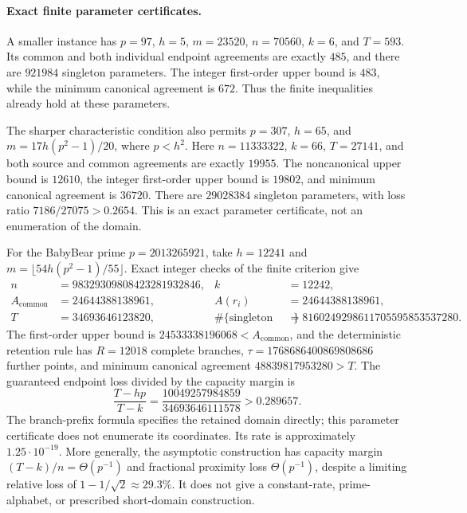 \paragraph{Exact finite parameter certificates.}
A smaller instance has $p=97$, $h=5$, $m=23520$, $n=70560$,
$k=6$, and $T=593$. Its common and both individual endpoint agreements are exactly $485$,
and there are $921984$ singleton
parameters. The integer first-order upper bound is $483$, while the
minimum canonical agreement is $672$. Thus the finite inequalities
already hold at these parameters.


The sharper characteristic condition also permits $p=307$, $h=65$,
and $m=17h(p^2-1)/20$, where $p<h^2$. Here
$n=11333322$, $k=66$, $T=27141$, and both source and common
agreements are exactly $19955$. The noncanonical upper bound is
$12610$, the integer first-order upper bound is $19802$, and minimum
canonical agreement is $36720$. There are $29028384$ singleton
parameters, with loss ratio $7186/27075>0.2654$. This is an exact
parameter certificate, not an enumeration of the domain.

For the BabyBear prime $p=2013265921$, take $h=12241$ and
$m=\lfloor54h(p^2-1)/55\rfloor$. Exact integer checks of the finite
criterion give
\[
 \begin{aligned}
 n&=98329309808423281932846,& k&=12242,\\
 A_{\mathrm{common}}&=24644388138961,&
 A(r_i)&=24644388138961,\\
 T&=34693646123820,&
 \#\{\text{singleton labels}\}&=8160249298611705595853537280.
 \end{aligned}
\]
The first-order upper bound is $24533338196068<A_{\mathrm{common}}$,
and the deterministic retention rule has $R=12018$ complete branches,
$\tau=1768686400869808686$ further points, and minimum canonical
agreement $48839817953280>T$. The guaranteed endpoint loss divided
by the capacity margin is
\[
 \frac{T-hp}{T-k}
 =\frac{10049257984859}{34693646111578}>0.289657.
\]
The branch-prefix formula specifies the retained domain directly; this
parameter certificate does not enumerate its coordinates. Its rate is
approximately $1.25\cdot10^{-19}$. More generally, the asymptotic
construction has capacity margin $(T-k)/n=\Theta(p^{-1})$ and
fractional proximity loss $\Theta(p^{-1})$, despite a limiting relative
loss of $1-1/\sqrt2\approx29.3\%$. It does not give a constant-rate,
prime-alphabet, or prescribed short-domain construction.
